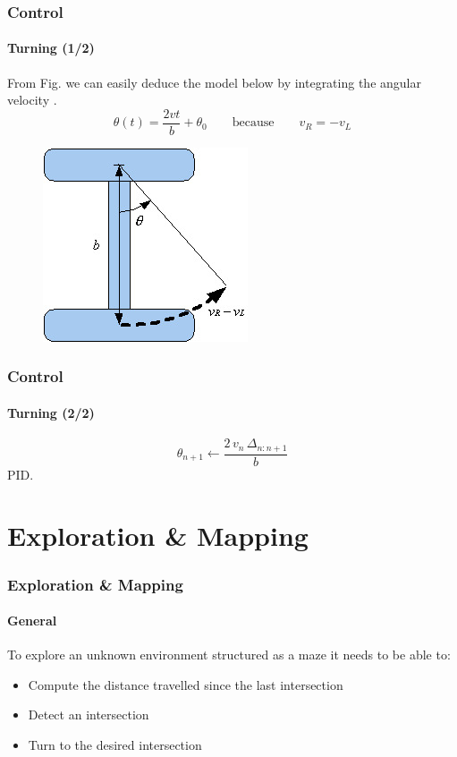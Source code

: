 \documentclass{beamer}
\begin{document}

\begin{frame}
\frametitle{Control}
\framesubtitle{Turning (1/2)}
From Fig. we can easily deduce the model below by integrating the angular velocity .
$$
\theta(t) = \frac{2vt}{b} + \theta_0
\qquad\text{because}\qquad	
v_R = -v_L
$$
\begin{figure}[hbtp]
\centering
\includegraphics[scale=0.5]{figures/differential-system.jpg}
\end{figure}
\end{frame}


\begin{frame}
\frametitle{Control}
\framesubtitle{Turning (2/2)}
$$
\theta_{n+1} \leftarrow \frac{2\, v_n\, \Delta_{n:n+1}}{b}
$$
PID. 
\end{frame}


\section{Exploration \& Mapping} 


\begin{frame}
\frametitle{Exploration \& Mapping}
\framesubtitle{General}
To explore an unknown environment structured as a maze it needs to be able to:
\begin{itemize}
\item Compute the distance travelled since the last intersection
\item Detect an intersection
\item Turn to the desired intersection
\end{itemize}
\end{frame}
\end{document}
